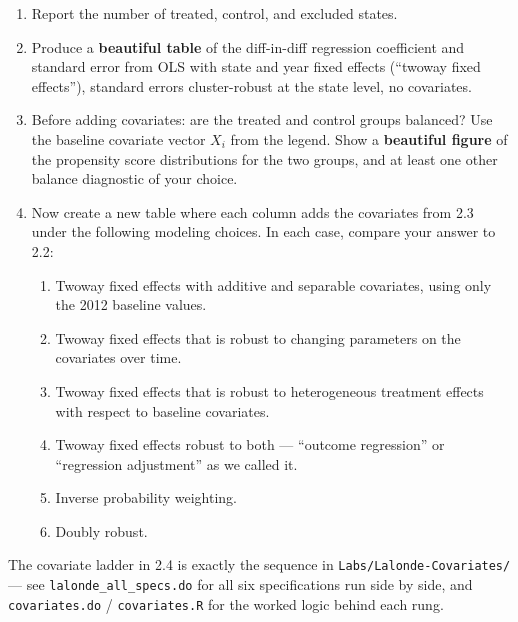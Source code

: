 \documentclass[11pt,a4paper]{article}
\newcommand{\code}[1]{\texttt{\color{ChiantiRed}#1}}
\begin{document}
\begin{enumerate}[label=2.\arabic*., itemsep=4pt, leftmargin=2.2em]
  \item Report the number of treated, control, and excluded states.
  \item Produce a \textbf{beautiful table} of the diff-in-diff regression coefficient and standard error from OLS with state and year fixed effects (``twoway fixed effects''), standard errors cluster-robust at the state level, no covariates.
  \item Before adding covariates: are the treated and control groups balanced? Use the baseline covariate vector $X_i$ from the legend. Show a \textbf{beautiful figure} of the propensity score distributions for the two groups, and at least one other balance diagnostic of your choice.
  \item Now create a new table where each column adds the covariates from 2.3 under the following modeling choices. In each case, compare your answer to 2.2:
  \begin{enumerate}[label=(\alph*), itemsep=2pt]
    \item Twoway fixed effects with additive and separable covariates, using only the 2012 baseline values.
    \item Twoway fixed effects that is robust to changing parameters on the covariates over time.
    \item Twoway fixed effects that is robust to heterogeneous treatment effects with respect to baseline covariates.
    \item Twoway fixed effects robust to both --- ``outcome regression'' or ``regression adjustment'' as we called it.
    \item Inverse probability weighting.
    \item Doubly robust.
  \end{enumerate}
\end{enumerate}

\begin{helpbox}
The covariate ladder in 2.4 is exactly the sequence in \code{Labs/Lalonde-Covariates/} --- see \code{lalonde\_all\_specs.do} for all six specifications run side by side, and \code{covariates.do} / \code{covariates.R} for the worked logic behind each rung.
\end{helpbox}

\end{document}
